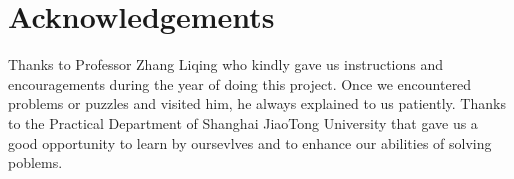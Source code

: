 \section{Acknowledgements}\label{sec:ack}
Thanks to Professor Zhang Liqing who kindly gave us instructions and encouragements during the year of doing this project. Once we encountered problems or puzzles and visited him, he always explained to us patiently. Thanks to the Practical Department of Shanghai JiaoTong University that gave us a good opportunity to learn by oursevlves and to enhance our abilities of solving poblems.

